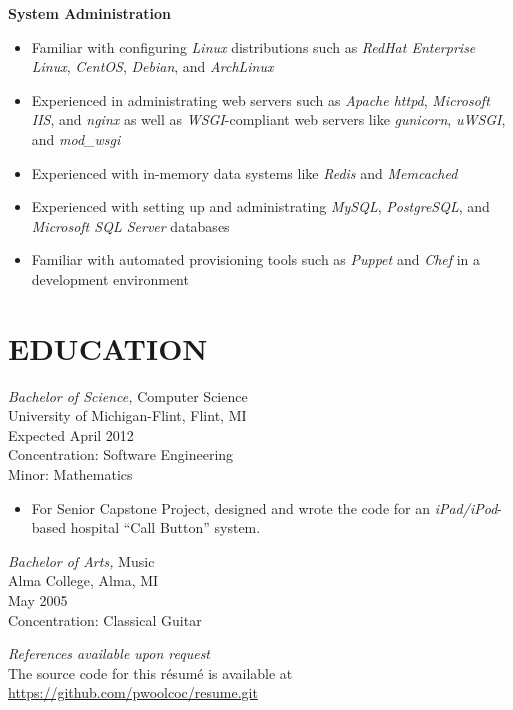 \documentclass[line,margin]{res}
\begin{document}
\begin{resume}
    \textbf{System Administration}
    \begin{itemize}
        \item Familiar with configuring {\sl Linux} distributions such as {\sl RedHat
              Enterprise Linux}, {\sl CentOS}, {\sl Debian}, and {\sl ArchLinux}
        \item Experienced in administrating web servers such as {\sl Apache httpd},
              {\sl Microsoft IIS}, and {\sl nginx} as well as
              {\sl WSGI}-compliant web servers like {\sl gunicorn},
              {\sl uWSGI}, and {\sl mod\_wsgi}
        \item Experienced with in-memory data systems like {\sl Redis} and {\sl Memcached}
        \item Experienced with setting up and administrating {\sl MySQL},
              {\sl PostgreSQL}, and {\sl Microsoft SQL Server} databases
        \item Familiar with automated provisioning tools such as {\sl Puppet}
              and {\sl Chef} in a development environment
    \end{itemize}



\section{EDUCATION} 
                {\sl Bachelor of Science,} Computer Science \\
                University of Michigan-Flint, Flint, MI \\
                Expected April 2012 \\
                Concentration: Software Engineering \\
                Minor: Mathematics
                \begin{itemize}
                    \item For Senior Capstone Project, designed and wrote 
                            the code for an {\sl iPad/iPod}-based hospital
                            ``Call Button'' system.
                \end{itemize}

                {\sl Bachelor of Arts,} Music \\
                Alma College, Alma, MI \\
                May 2005 \\
                Concentration: Classical Guitar

\end{resume}

\begin{flushleft}
{\sl References available upon request} \\
        \vspace{2 mm}
The source code for this r\'{e}sum\'{e} is available at
\href{https://github.com/pwoolcoc/resume.git}{https://github.com/pwoolcoc/resume.git}
\end{flushleft}
\end{document}
